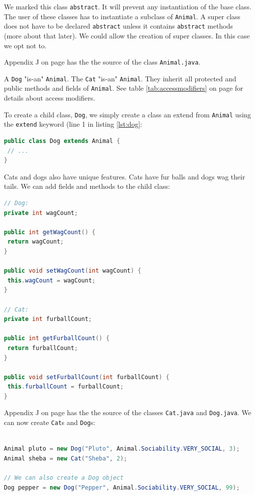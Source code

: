 We marked this class \texttt{abstract}. It will prevent any instantiation of the base class. The user of these classes has to instantiate a subclass of \texttt{Animal}. A super class does not have to be declared \texttt{abstract} unless it contains \texttt{abstract} methods (more about that later). We could allow the creation of super classes. In this case we opt not to.

Appendix J on page \pageref{App:AppendixJ} has the the source of the class \texttt{Animal.java}.

A \texttt{Dog} "is-an" \texttt{Animal}. The \texttt{Cat} "is-an" \texttt{Animal}. They inherit all protected and public methods and fields of \texttt{Animal}. See table \ref{tab:accessmodifiers} on page \pageref{tab:accessmodifiers} for details about access modifiers.

To create a child class, \texttt{Dog}, we simply create a class an extend from \texttt{Animal} using the \texttt{extend} keyword (line 1 in listing \ref{lst:dog}:

\begin{lstlisting}[language=Java, label=lst:dog]
public class Dog extends Animal {
 // ...
}
\end{lstlisting}

Cats and dogs also have unique features.  Cats have fur balls and dogs wag their tails. We can add fields and methods to the child class:
\begin{lstlisting}[language=Java]
// Dog: 
private int wagCount;

public int getWagCount() {
 return wagCount;
}

public void setWagCount(int wagCount) {
 this.wagCount = wagCount;
}

// Cat:
private int furballCount;

public int getFurballCount() {
 return furballCount;
}

public void setFurballCount(int furballCount) {
 this.furballCount = furballCount;
}
\end{lstlisting}
Appendix J on page \pageref{App:AppendixJ} has the the source of the classes \texttt{Cat.java} and \texttt{Dog.java}.
We can now create \texttt{Cat}s and \texttt{Dog}s:
\begin{lstlisting}[language=Java]

Animal pluto = new Dog("Pluto", Animal.Sociability.VERY_SOCIAL, 3);
Animal sheba = new Cat("Sheba", 2);

// We can also create a Dog object
Dog pepper = new Dog("Pepper", Animal.Sociability.VERY_SOCIAL, 99);

\end{lstlisting}

